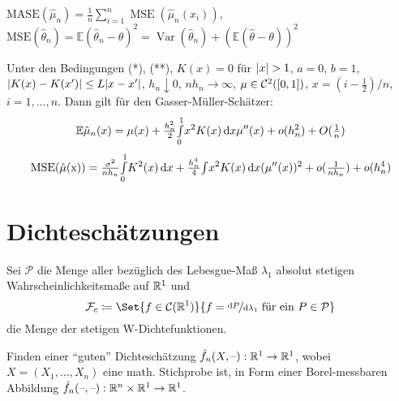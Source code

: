 \documentclass{cheat-sheet}
\newcommand{\E}{\mathbb{E}} %
\newcommand{\Cont}{\mathcal{C}} %
\DeclareMathOperator{\MSE}{MSE} %
\DeclareMathOperator{\var}{Var} %
\begin{document}
\begin{defn}
  \begin{minipage}[t]{0.8 \linewidth}
    $\mathrm{MASE}(\hat{\mu}_n) = \tfrac{1}{n} \sum_{i=1}^n \MSE(\hat{\mu}_n (x_i))$, \\
    $\mathrm{MSE}(\hat{\theta}_n) = \E (\hat{\theta}_n - \theta)^2 = \var(\hat{\theta}_n) + (\E (\hat{\theta} - \theta))^2$
  \end{minipage}
\end{defn}


\begin{satz}
  Unter den Bedingungen (*), (**), $K(x) = 0$ für $\lvert x\rvert > 1$, $a=0$, $b=1$, $\lvert K(x) - K(x')\rvert \leq L \lvert x - x'\rvert$, $h_n \downarrow 0$, $n h_n \to \infty$, $\mu \in \Cont^2(\cinterval{0}{1})$, $x = (i - \tfrac{1}{2}) / n$, $i = 1, \ldots, n$.
  Dann gilt für den Gasser-Müller-Schätzer:
  \[
    \E \hat{\mu}_n(x) = \mu(x) + \tfrac{h_n^2}{2} \Int{0}{1}{x^2 K(x)}{x} \mu''(x) + o(h_n^2) + O(\tfrac{1}{n})
  \]
  \[
    \mathrm{MSE(\hat{\mu}(x))} = \tfrac{\sigma^2}{n h_n} {\textstyle \int\limits_{0}^{1}} K^2 (x) \,\mathrm{d} x + \tfrac{h_n^4}{4} {\textstyle \int} x^2 K(x) \,\mathrm{d} x (\mu''(x))^2 + o(\tfrac{1}{n h_n}) + o(h_n^4)
  \]
\end{satz}



\section{Dichteschätzungen}


\begin{nota}
  Sei $\mathcal{P}$ die Menge aller bezüglich des Lebesgue-Maß $\lambda_1$ absolut stetigen Wahrscheinlichkeitsmaße auf $\mathbb{R}^1$ und
  \[ \mathcal{F}_c \coloneqq \Set{f \in \Cont(\R^1)}{f = \nicefrac{\d P}{\d \lambda_1} \text{ für ein } P \in \mathcal{P}} \]
  die Menge der stetigen W-Dichtefunktionen.
\end{nota}

\begin{ziel}
  Finden einer "`guten"' Dichteschätzung $\hat{f}_n(X, \text{--}) : \mathbb{R}^1 \to \mathbb{R}^1$, wobei $X = (X_1, \ldots, X_n)$ eine math. Stichprobe ist, in Form einer Borel-messbaren Abbildung $\hat{f}_n(\text{--}, \text{--}) : \mathbb{R}^n \times \mathbb{R}^1 \to \mathbb{R}^1$.
\end{ziel}
\end{document}

